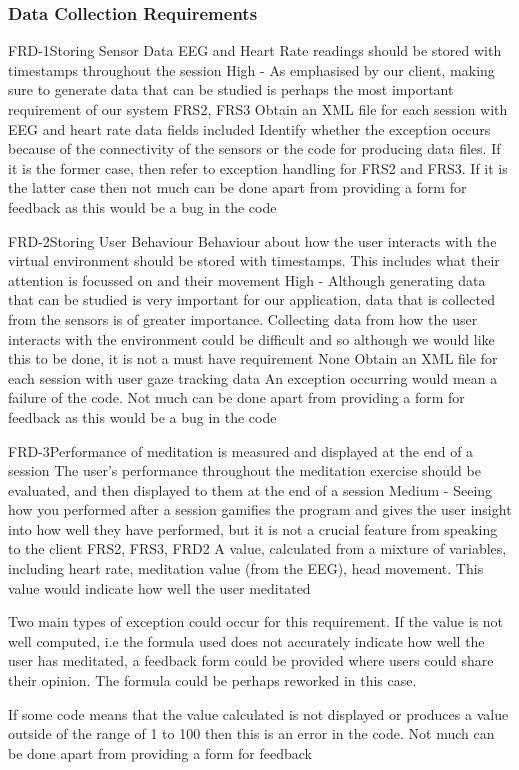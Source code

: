 \documentclass[coverpage,lineno]{../custom}
\begin{document}
\subsubsection{Data Collection Requirements}

\FunctionalReq
{FRD-1}{Storing Sensor Data}
{EEG and Heart Rate readings should be stored with timestamps throughout the session}
{High - \musthave}
{As emphasised by our client, making sure to generate data that can be studied is perhaps the most important requirement of our system}
{FRS2, FRS3}
{Obtain an XML file for each session with EEG and heart rate data fields included}
{Identify whether the exception occurs because of the connectivity of the sensors or the code for producing data files. If it is the former case, then refer to exception handling for FRS2 and FRS3. If it is the latter case then not much can be done apart from providing a form for feedback as this would be a bug in the code}

\FunctionalReq
{FRD-2}{Storing User Behaviour}
{Behaviour about how the user interacts with the virtual environment should be stored with timestamps. This includes what their attention is focussed on and their movement}
{High - \shouldhave}
{Although generating data that can be studied is very important for our application, data that is collected from the sensors is of greater importance. Collecting data from how the user interacts with the environment could be difficult and so although we would like this to be done, it is not a must have requirement}
{None}
{Obtain an XML file for each session with user gaze tracking data}
{An exception occurring would mean a failure of the code. Not much can be done apart from providing a form for feedback as this would be a bug in the code}

\FunctionalReq
{FRD-3}{Performance of meditation is measured and displayed at the end of a session}
{The user's performance throughout the meditation exercise should be evaluated, and then displayed to them at the end of a session}
{Medium - \couldhave}
{Seeing how you performed after a session gamifies the program and gives the user insight into how well they have performed, but it is not a crucial feature from speaking to the client}
{FRS2, FRS3, FRD2}
{A value, calculated from a mixture of variables, including heart rate, meditation value (from the EEG), head movement. This value would indicate how well the user meditated}
{Two main types of exception could occur for this requirement. If the value is not well computed, i.e the formula used does not accurately indicate how well the user has meditated, a feedback form could be provided where users could share their opinion. The formula could be perhaps reworked in this case.

If some code means that the value calculated is not displayed or produces a value outside of the range of 1 to 100 then this is an error in the code. Not much can be done apart from providing a form for feedback}
\end{document}
